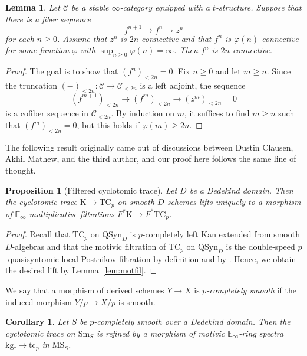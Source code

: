 \documentclass{amsart}
\numberwithin{equation}{section}
\theoremstyle{plain}
\newtheorem{proposition}[equation]{Proposition}
\newtheorem{lemma}[equation]{Lemma}
\newtheorem{corollary}[equation]{Corollary}
\theoremstyle{definition}
\def\ph{\mathord-}
\def\E{\mathbb{E}}
\let\cat=\mathrm
\def\K{\mathrm{K}{}}
\def\Sm{{\cat{S}\mathrm{m}}}
\def\MS{\mathrm{MS}}
\newcommand{\CC}{\mathcal{C}}
\newcommand{\QSyn}{\mathrm{QSyn}}
\newcommand{\TC}{\mathrm{TC}}
\newcommand{\kgl}{\mathrm{kgl}}
\newcommand{\tc}{\mathrm{tc}}
\let\phi=\varphi
\begin{document}
\begin{lemma}\label{lem:2n-connective}
Let $\CC$ be a stable $\infty$-category equipped with a $t$-structure.
Suppose that there is a fiber sequence
\[
	f^{n+1} \to f^n \to z^n
\]
for each $n\ge 0$.
Assume that $z^n$ is $2n$-connective and that $f^n$ is $\phi(n)$-connective for some function $\phi$ with $\sup_{n\geq 0}\phi(n)=\infty$.
Then $f^n$ is $2n$-connective.
\end{lemma}

\begin{proof}
The goal is to show that $(f^n)_{<2n}=0$.
Fix $n\ge 0$ and let $m\ge n$.
Since the truncation $(\ph)_{<2n}\colon\CC\to\CC_{<2n}$ is a left adjoint, the sequence
\[
	(f^{m+1})_{<2n} \to (f^m)_{<2n} \to (z^m)_{<2n}=0
\]
is a cofiber sequence in $\CC_{<2n}$.
By induction on $m$, it suffices to find $m\ge n$ such that $(f^m)_{<2n}=0$, but this holds if $\phi(m)\ge 2n$.
\end{proof}

The following result originally came out of discussions between Dustin Clausen, Akhil Mathew, and the third author, and our proof here follows the same line of thought.

\begin{proposition}[Filtered cyclotomic trace]\label{prop:motfil}
Let $D$ be a Dedekind domain.
Then the cyclotomic trace $\K\to\TC_p$ on smooth $D$-schemes lifts uniquely to a morphism of $\E_\infty$-multiplicative filtrations $F^*\K\to F^*\TC_p$.
\end{proposition}

\begin{proof}
Recall that $\TC_p$ on $\QSyn_D$ is $p$-completely left Kan extended from smooth $D$-algebras and that the motivic filtration of $\TC_p$ on $\QSyn_D$ is the double-speed $p$-quasisyntomic-local Postnikov filtration by definition and by \cite[Theorem~14.1]{BS:2022}.
Hence, we obtain the desired lift by Lemma~\ref{lem:motfil}.
\end{proof}

We say that a morphism of derived schemes $Y\to X$ is \emph{$p$-completely smooth} if the induced morphism $Y/p\to X/p$ is smooth.

\begin{corollary}\label{cor:motfil}
	Let $S$ be $p$-completely smooth over a Dedekind domain. Then the cyclotomic trace on $\Sm_S$ is refined by a morphism of motivic $\E_\infty$-ring spectra $\kgl\to\tc_p$ in $\MS_S$.
\end{corollary}
\end{document}
